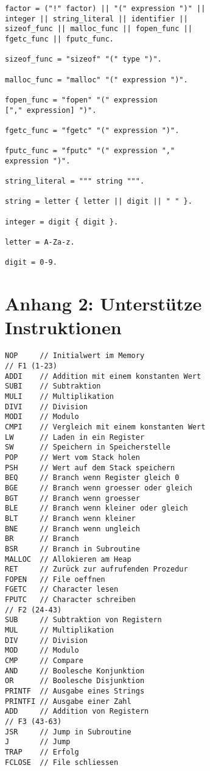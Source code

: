\documentclass[a4paper,12pt]{article}
\begin{document}
\begin{lstlisting}
factor = ("!" factor) || "(" expression ")" || 
integer || string_literal || identifier || 
sizeof_func || malloc_func || fopen_func ||
fgetc_func || fputc_func.

sizeof_func = "sizeof" "(" type ")".

malloc_func = "malloc" "(" expression ")".

fopen_func = "fopen" "(" expression 
["," expression] ")".

fgetc_func = "fgetc" "(" expression ")".

fputc_func = "fputc" "(" expression ","
expression ")".

string_literal = """ string """.

string = letter { letter || digit || " " }.

integer = digit { digit }.

letter = A-Za-z.

digit = 0-9.
	\end{lstlisting}
	
	\newpage
	\section{Anhang 2: Unterstütze Instruktionen}
	\begin{lstlisting}
NOP 	// Initialwert im Memory
// F1 (1-23)
ADDI	// Addition mit einem konstanten Wert
SUBI	// Subtraktion
MULI	// Multiplikation
DIVI	// Division
MODI	// Modulo
CMPI	// Vergleich mit einem konstanten Wert
LW  	// Laden in ein Register
SW  	// Speichern in Speicherstelle
POP 	// Wert vom Stack holen
PSH 	// Wert auf dem Stack speichern
BEQ 	// Branch wenn Register gleich 0
BGE 	// Branch wenn groesser oder gleich
BGT 	// Branch wenn groesser
BLE 	// Branch wenn kleiner oder gleich
BLT 	// Branch wenn kleiner
BNE 	// Branch wenn ungleich
BR  	// Branch
BSR 	// Branch in Subroutine
MALLOC 	// Allokieren am Heap
RET 	// Zurück zur aufrufenden Prozedur
FOPEN 	// File oeffnen
FGETC 	// Character lesen
FPUTC 	// Character schreiben
// F2 (24-43)
SUB 	// Subtraktion von Registern
MUL 	// Multiplikation
DIV 	// Division
MOD 	// Modulo
CMP 	// Compare
AND 	// Boolesche Konjunktion
OR  	// Boolesche Disjunktion
PRINTF 	// Ausgabe eines Strings
PRINTFI // Ausgabe einer Zahl
ADD 	// Addition von Registern
// F3 (43-63)
JSR 	// Jump in Subroutine
J   	// Jump
TRAP 	// Erfolg
FCLOSE 	// File schliessen
	\end{lstlisting}
\end{document}
